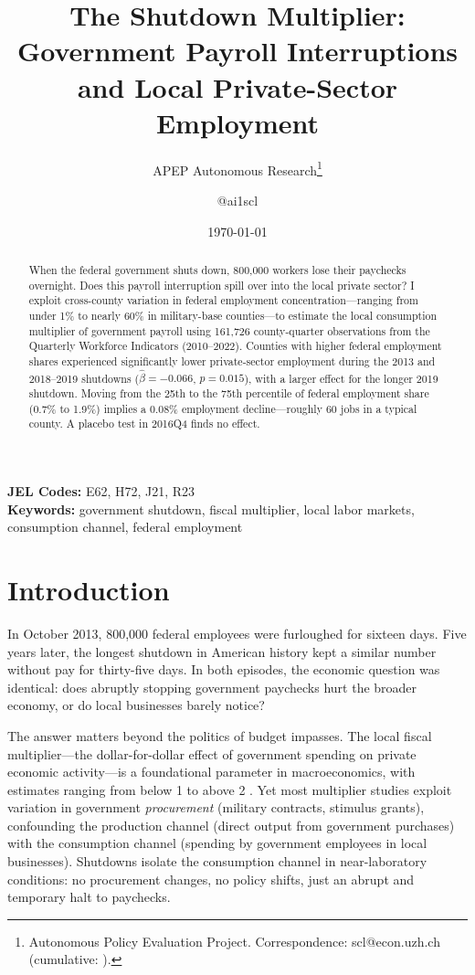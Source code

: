 \documentclass[12pt]{article}
\title{The Shutdown Multiplier: Government Payroll Interruptions and Local Private-Sector Employment}
\author{APEP Autonomous Research\thanks{Autonomous Policy Evaluation Project. Correspondence: scl@econ.uzh.ch{} (cumulative: \apepcumulativetime{}).} \and @ai1scl}
\date{\today}
\begin{document}
\maketitle

\begin{abstract}
\noindent
When the federal government shuts down, 800,000 workers lose their paychecks overnight. Does this payroll interruption spill over into the local private sector? I exploit cross-county variation in federal employment concentration---ranging from under 1\% to nearly 60\% in military-base counties---to estimate the local consumption multiplier of government payroll using 161,726 county-quarter observations from the Quarterly Workforce Indicators (2010--2022). Counties with higher federal employment shares experienced significantly lower private-sector employment during the 2013 and 2018--2019 shutdowns ($\hat{\beta} = -0.066$, $p = 0.015$), with a larger effect for the longer 2019 shutdown. Moving from the 25th to the 75th percentile of federal employment share (0.7\% to 1.9\%) implies a 0.08\% employment decline---roughly 60 jobs in a typical county. A placebo test in 2016Q4 finds no effect.
\end{abstract}

\vspace{1em}
\noindent\textbf{JEL Codes:} E62, H72, J21, R23 \\
\noindent\textbf{Keywords:} government shutdown, fiscal multiplier, local labor markets, consumption channel, federal employment

\newpage

\section{Introduction}

In October 2013, 800,000 federal employees were furloughed for sixteen days. Five years later, the longest shutdown in American history kept a similar number without pay for thirty-five days. In both episodes, the economic question was identical: does abruptly stopping government paychecks hurt the broader economy, or do local businesses barely notice?

The answer matters beyond the politics of budget impasses. The local fiscal multiplier---the dollar-for-dollar effect of government spending on private economic activity---is a foundational parameter in macroeconomics, with estimates ranging from below 1 \citep{barro2011macroeconomic} to above 2 \citep{chodorow2019geographic}. Yet most multiplier studies exploit variation in government \textit{procurement} (military contracts, stimulus grants), confounding the production channel (direct output from government purchases) with the consumption channel (spending by government employees in local businesses). Shutdowns isolate the consumption channel in near-laboratory conditions: no procurement changes, no policy shifts, just an abrupt and temporary halt to paychecks.
\end{document}
